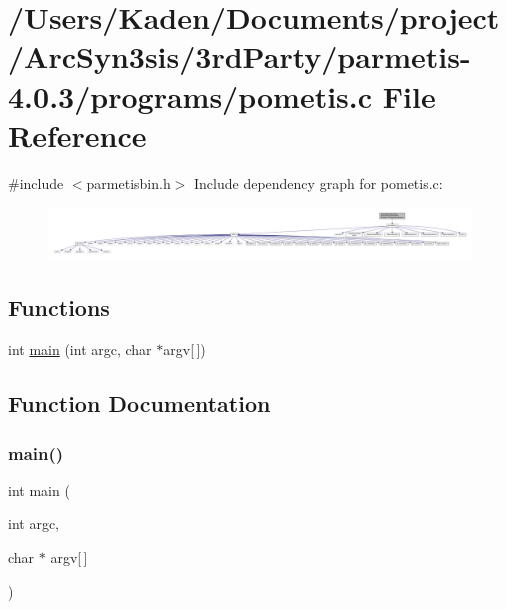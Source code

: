 \hypertarget{a00434}{}\section{/\+Users/\+Kaden/\+Documents/project/\+Arc\+Syn3sis/3rd\+Party/parmetis-\/4.0.3/programs/pometis.c File Reference}
\label{a00434}
{\ttfamily \#include $<$parmetisbin.\+h$>$}\newline
Include dependency graph for pometis.\+c\+:\nopagebreak
\begin{figure}[H]
\begin{center}
\leavevmode
\includegraphics[width=350pt]{a00435}
\end{center}
\end{figure}
\subsection*{Functions}
\begin{DoxyCompactItemize}
\item 
int \hyperlink{a00434_a0ddf1224851353fc92bfbff6f499fa97}{main} (int argc, char $\ast$argv\mbox{[}$\,$\mbox{]})
\end{DoxyCompactItemize}


\subsection{Function Documentation}
\mbox{\label{a00434_a0ddf1224851353fc92bfbff6f499fa97}} 
\subsubsection{\texorpdfstring{main()}{main()}}
{\footnotesize\ttfamily int main (\begin{DoxyParamCaption}\item[{int}]{argc,  }\item[{char $\ast$}]{argv\mbox{[}$\,$\mbox{]} }\end{DoxyParamCaption})}

